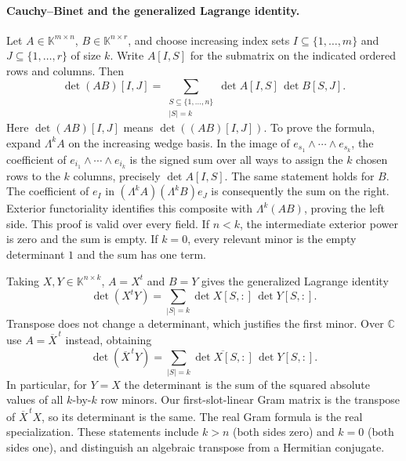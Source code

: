 \documentclass[11pt,a4paper]{book}
\theoremstyle{definition}\newtheorem{definition}[theorem]{Definition}
\theoremstyle{remark}\newtheorem{remark}[theorem]{Remark}
\newcommand{\K}{\mathbb K}\newcommand{\R}{\mathbb R}\newcommand{\C}{\mathbb C}
\begin{document}
\paragraph{Cauchy--Binet and the generalized Lagrange identity.}
Let $A\in\K^{m\times n}$, $B\in\K^{n\times r}$, and choose increasing index sets $I\subseteq\{1,\ldots,m\}$ and $J\subseteq\{1,\ldots,r\}$ of size $k$. Write $A[I,S]$ for the submatrix on the indicated ordered rows and columns. Then
\[
 \det(AB)[I,J]
 =\sum_{\substack{S\subseteq\{1,\ldots,n\}\\|S|=k}}
       \det A[I,S]\,\det B[S,J].
\]
Here $\det(AB)[I,J]$ means $\det((AB)[I,J])$. To prove the formula, expand $\Lambda^k A$ on the increasing wedge basis. In the image of $e_{s_1}\wedge\cdots\wedge e_{s_k}$, the coefficient of $e_{i_1}\wedge\cdots\wedge e_{i_k}$ is the signed sum over all ways to assign the $k$ chosen rows to the $k$ columns, precisely $\det A[I,S]$. The same statement holds for $B$. The coefficient of $e_I$ in $(\Lambda^kA)(\Lambda^kB)e_J$ is consequently the sum on the right. Exterior functoriality identifies this composite with $\Lambda^k(AB)$, proving the left side. This proof is valid over every field. If $n<k$, the intermediate exterior power is zero and the sum is empty. If $k=0$, every relevant minor is the empty determinant $1$ and the sum has one term.

Taking $X,Y\in\K^{n\times k}$, $A=X^t$ and $B=Y$ gives the generalized Lagrange identity
\[
 \det(X^tY)=\sum_{|S|=k}\det X[S,:]\,\det Y[S,:].
\]
Transpose does not change a determinant, which justifies the first minor. Over $\C$ use $A=\overline X^{\,t}$ instead, obtaining
\[
 \det(\overline X^{\,t}Y)=\sum_{|S|=k}\overline{\det X[S,:]}\,\det Y[S,:].
\]
In particular, for $Y=X$ the determinant is the sum of the squared absolute values of all $k$-by-$k$ row minors. Our first-slot-linear Gram matrix is the transpose of $\overline X^{\,t}X$, so its determinant is the same. The real Gram formula is the real specialization. These statements include $k>n$ (both sides zero) and $k=0$ (both sides one), and distinguish an algebraic transpose from a Hermitian conjugate.
\end{document}
